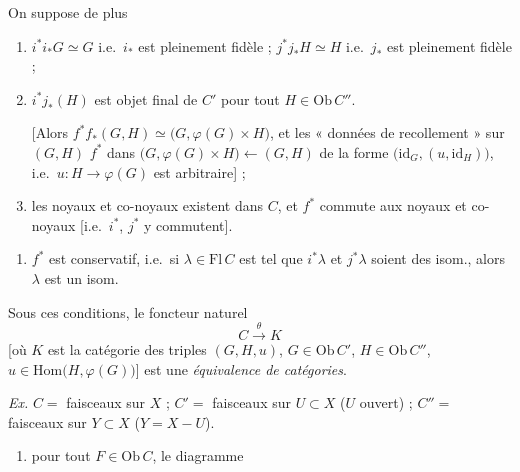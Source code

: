 \documentclass[11pt,a4paper]{article}
\begin{document}
On suppose de plus
\begin{enumerate}
\item[(a)] $i^{*} i_{*} G \simeq G$ i.e.\ $i_{*}$ est pleinement fidèle ;
      $j^{*} j_{*} H \simeq H$ i.e.\ $j_{*}$ est pleinement fidèle ;
\item[(b)] $i^{*} j_{*}(H)$ est objet final de $C'$ pour tout
      $H \in \mathrm{Ob}\, C''$.

      [Alors $f^{*} f_{*}(G, H) \simeq \bigl( G, \varphi(G) \times H \bigr)$,
      et \struck{\ill{}} les « données de recollement » sur $(G, H)$ \ill{}
      $f^{*}$ \ill{} dans \ill{}
      $\bigl( G, \varphi(G) \times H \bigr) \longleftarrow (G, H)$ de la forme
      $\bigl( \mathrm{id}_{G}, (u, \mathrm{id}_{H}) \bigr)$, i.e.\
      $u : H \to \varphi(G)$ est arbitraire] ;
\item[(c)] les noyaux et co-noyaux existent dans $C$, et $f^{*}$ commute aux
      noyaux et co-noyaux [i.e.\ $i^{*}$, $j^{*}$ y commutent].
\end{enumerate}

\begin{enumerate}
\item[(d)] $f^{*}$ est conservatif, i.e.\ si $\lambda \in \mathrm{Fl}\, C$ est
      tel que $i^{*}\lambda$ et $j^{*}\lambda$ soient des isom., alors
      $\lambda$ est un isom.
\end{enumerate}

Sous ces conditions, le foncteur naturel
\[
  C \xrightarrow{\ \theta\ } K
\]
[où $K$ est la \struck{\ill{}} catégorie des triples $(G, H, u)$,
$G \in \mathrm{Ob}\, C'$, $H \in \mathrm{Ob}\, C''$,
$u \in \mathrm{Hom}\bigl( H, \varphi(G) \bigr)$] est une \emph{équivalence de
catégories}.

\emph{Ex.} \struck{\ill{}} $C = $ faisceaux sur $X$ ; $C' = $ faisceaux sur
$U \subset X$ ($U$ ouvert) ; $C'' = $ faisceaux sur $Y \subset X$
($Y = X - U$).

 \ill{} \struck{\ill{}}
\begin{enumerate}
\item[d$'$)] pour tout $F \in \mathrm{Ob}\, C$, le diagramme
\end{enumerate}

\end{document}
